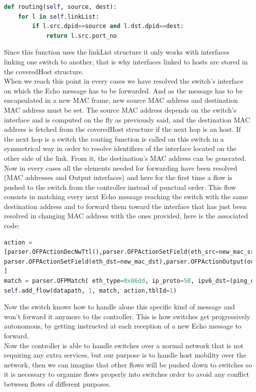 \documentclass{article}
\begin{document}
\begin{lstlisting}[frame=single,language=Python, breaklines=true] 
def routing(self, source, dest):
    for l in self.linkList:
        if l.src.dpid==source and l.dst.dpid==dest:
            return l.src.port_no
\end{lstlisting}

Since this function uses the linkList structure it only works with
interfaces linking one switch to another, that is why interfaces
linked to hosts are stored in the coveredHost structure.\\
\newline
When we reach this point in every cases we have resolved the switch's
interface on which the Echo message has to be forwarded. And as the
message has to be encapsulated in a new MAC frame, new source MAC
address and destination MAC address must be set. The source MAC
address depends on the switch's interface and is computed on the fly
as previously said, and the destination MAC address is fetched from
the coveredHost structure if the next hop is an host. If the next hop
is a switch the routing function is called on this switch in a
symmetrical way in order to resolve identifiers of the interface
located on the other side of the link. From it, the destination's MAC
address can be generated.\\
\newline
Now in every cases all the elements needed for forwarding have been
resolved (MAC addresses and Output interfaces) and here for the first
time a flow is pushed to the switch from the controller instead of
punctual order. This flow consists in matching every next Echo message
reaching the switch with the same destination address and to forward
them toward the interface that has just been resolved in changing MAC
address with the ones provided, here is the associated code:

\begin{lstlisting}[frame=single,language=Python, breaklines=true] 
action =
[parser.OFPActionDecNwTtl(),parser.OFPActionSetField(eth_src=new_mac_src),
parser.OFPActionSetField(eth_dst=new_mac_dst),parser.OFPActionOutput(outputIntf)
]
match = parser.OFPMatch( eth_type=0x86dd, ip_proto=58, ipv6_dst=(ping_dst,'ffff:ffff:ffff:ffff:ffff:ffff:ffff:ffff'))
self.add_flow(datapath, 1, match, action,tblId=1)
\end{lstlisting}

Now the switch knows how to handle alone this specific kind of message
and won't forward it anymore to the controller. This is how switches
get progressively autonomous, by getting instructed at each reception
of a new Echo message to forward.\\
\newline
Now the controller is able to handle switches over a normal network
that is not requiring any extra services, but our purpose is to handle
host mobility over the network, then we can imagine that other flows
will be pushed down to switches so it is necessary to organize flows
properly into switches order to avoid any conflict between flows of
different purposes.
\end{document}
